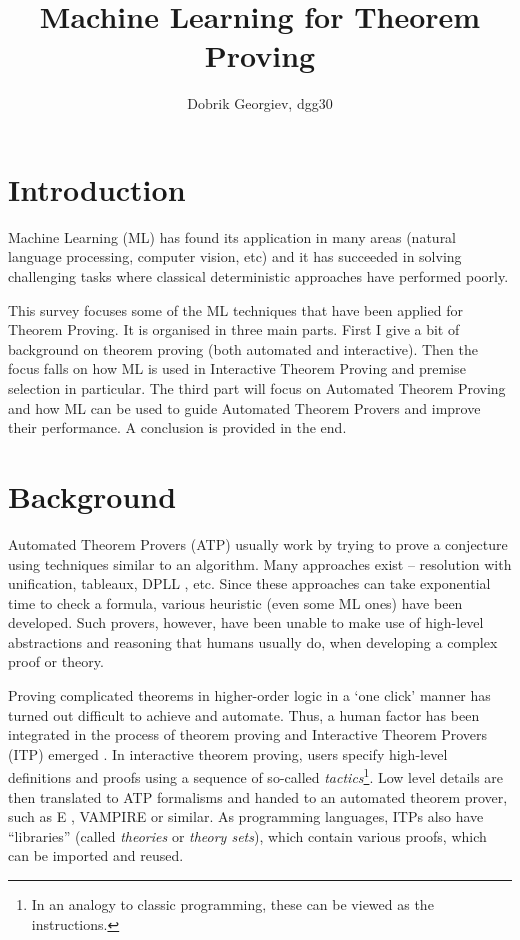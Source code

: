 \documentclass{article}
\title{Machine Learning for Theorem Proving}
\author{Dobrik Georgiev, dgg30}
\begin{document}
\maketitle
\section{Introduction}

Machine Learning (ML) has found its application in many areas (natural language
processing, computer vision, etc) and it has succeeded in solving challenging
tasks where classical deterministic approaches have performed poorly.

This survey focuses some of the ML techniques that have been applied for
Theorem Proving. It is organised in three main parts. First I give a bit of
background on theorem proving (both automated and interactive). Then the focus
falls on how ML is used in Interactive Theorem Proving and premise selection in
particular. The third part will focus on Automated Theorem Proving and how ML
can be used to guide Automated Theorem Provers and improve their performance.
A conclusion is provided in the end.

\nocite{LearningToProveITP}


\section{Background}

Automated Theorem Provers (ATP) usually work by trying to prove a conjecture
using techniques similar to an algorithm. Many approaches exist -- resolution
with unification, tableaux, DPLL \citep{DPLL}, etc. Since these approaches can
take exponential time to check a formula, various heuristic (even some ML ones)
have been developed. Such provers, however, have been unable to make use of
high-level abstractions and reasoning that humans usually do, when developing
a complex proof or theory.

Proving complicated theorems in higher-order logic in a `one click' manner has
turned out difficult to achieve and automate. Thus, a human factor has been
integrated in the process of theorem proving and Interactive Theorem Provers
(ITP) emerged \citep{HistoryITP}. In interactive theorem proving, users specify
high-level definitions and proofs using a sequence of so-called
\textit{tactics}\footnote{In an analogy to classic programming, these can be
viewed as the instructions.}. Low level details are then translated to ATP
formalisms and handed to an automated theorem prover, such as
E \citep{Eprover}, VAMPIRE \citep{VAMPIRE} or similar. As programming
languages, ITPs also have ``libraries'' (called \emph{theories} or \emph{theory
sets}), which contain various proofs, which can be imported and reused.
\end{document}
